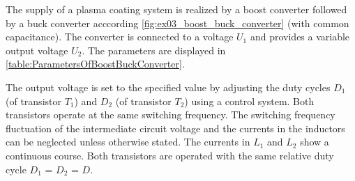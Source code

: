 



The supply of a plasma coating system is realized by a boost converter followed by a buck converter acccording \autoref{fig:ex03_boost_buck_converter} (with common capacitance).
The converter is connected to a voltage $U_\mathrm{1}$ and provides a variable output voltage $U_\mathrm{2}$. The parameters are displayed in \autoref{table:ParametersOfBoostBuckConverter}.
\vspace{2em}\par

\par

\par


The output voltage is set to the specified value by adjusting the duty cycles $D_\mathrm{1}$ (of transistor $T_\mathrm{1}$) 
and $D_\mathrm{2}$ (of transistor $T_\mathrm{2}$) using a control system. Both transistors operate at the same switching frequency. 
The switching frequency fluctuation of the intermediate circuit voltage and the currents in the inductors can be neglected unless otherwise stated. 
The currents in $L_\mathrm{1}$ and $L_\mathrm{2}$ show a continuous course. Both transistors are operated with the 
same relative duty cycle $D_\mathrm{1}$ = $D_\mathrm{2}$ = $D$.




